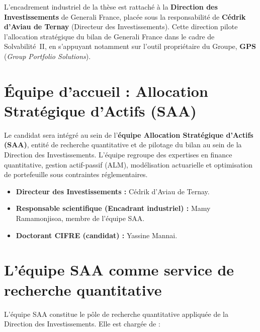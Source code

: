 \documentclass[10pt,a4paper]{article}
\begin{document}
L'encadrement industriel de la thèse est rattaché à la \textbf{Direction des
Investissements} de Generali France, placée sous la responsabilité de
\textbf{Cédrik d'Aviau de Ternay} (Directeur des Investissements).  Cette
direction pilote l'allocation stratégique du bilan de Generali France dans le
cadre de Solvabilité~II, en s'appuyant notamment sur l'outil propriétaire du
Groupe, \textbf{GPS} (\textit{Group Portfolio Solutions}).

\section{Équipe d'accueil : Allocation Stratégique d'Actifs (SAA)}

Le candidat sera intégré au sein de l'\textbf{équipe Allocation Stratégique
d'Actifs (SAA)}, entité de recherche quantitative et de pilotage du bilan au
sein de la Direction des Investissements.  L'équipe regroupe des expertises en
finance quantitative, gestion actif-passif (ALM), modélisation actuarielle et
optimisation de portefeuille sous contraintes réglementaires.

\begin{itemize}[leftmargin=1.6em,itemsep=1pt]
  \item \textbf{Directeur des Investissements :} Cédrik d'Aviau de Ternay.
  \item \textbf{Responsable scientifique (Encadrant industriel) :}
        Mamy Ramamonjisoa, membre de l'équipe SAA.
  \item \textbf{Doctorant CIFRE (candidat) :} Yassine Mannai.
\end{itemize}

\section{L'équipe SAA comme service de recherche quantitative}

L'équipe SAA constitue le pôle de recherche quantitative appliquée de la
Direction des Investissements.  Elle est chargée de :
\end{document}
